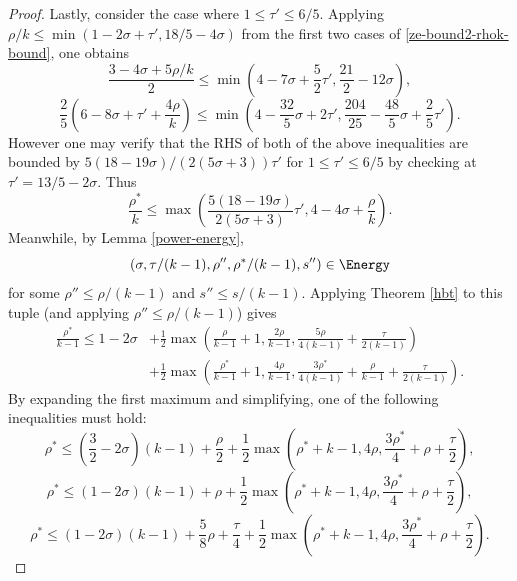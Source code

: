 \begin{proof}
Lastly, consider the case where $1 \le \tau' \le 6/5$. Applying $\rho/k \le \min(1 - 2\sigma + \tau', 18/5 - 4\sigma)$ from the first two cases of \eqref{ze-bound2-rhok-bound}, one obtains
\[
    \frac{3 - 4\sigma + 5\rho/k}{2} \le \min\left(4 - 7\sigma + \frac{5}{2}\tau', \frac{21}{2} - 12\sigma\right),
\]
\[
    \frac{2}{5}(6 - 8\sigma + \tau' + \frac{4\rho}{k}) \le \min\left(4 - \frac{32}{5}\sigma + 2\tau', \frac{204}{25} - \frac{48}{5}\sigma + \frac{2}{5}\tau'\right).
\]
However one may verify that the RHS of both of the above inequalities are bounded by $5(18 - 19\sigma)/(2(5\sigma + 3))\tau'$ for $1 \le \tau' \le 6/5$ by checking at $\tau' = 13/5 - 2\sigma$. Thus
\begin{equation}
    \label{ze-bound2-rhok-temp1}
    \frac{\rho^*}{k} \le \max\left(\frac{5(18 - 19\sigma)}{2(5\sigma + 3)}\tau', 4 - 4\sigma + \frac{\rho}{k}\right).
\end{equation}
Meanwhile, by Lemma \ref{power-energy},
\[
(\sigma, \tau/(k-1), \rho'', \rho^*/(k-1), s'')\in\Energy
\]
for some $\rho''\le\rho/(k-1)$ and $s''\le s/(k-1)$. Applying Theorem \ref{hbt} to this tuple (and applying $\rho''\le \rho/(k-1)$) gives
\begin{equation}\label{ze-bound2-rhostar-k1}
\begin{split}
\frac{\rho^*}{k - 1} \le 1-2\sigma &+ \frac{1}{2}\max(\frac{\rho}{k - 1}+1, \frac{2\rho}{k -1 }, \frac{5\rho}{4(k - 1)} + \frac{\tau}{2(k - 1)}) \\
&+ \frac{1}{2}\max(\frac{\rho^*}{k - 1}+1, \frac{4\rho}{k - 1}, \frac{3\rho^*}{4(k - 1)} +\frac{\rho}{k - 1}+\frac{\tau}{2(k-1)}).
\end{split}
\end{equation}
By expanding the first maximum and simplifying, one of the following inequalities must hold:
\begin{equation}\label{ze-bound2-rhostar-k1-case1}
    \rho^* \le (\frac{3}{2} - 2\sigma)(k - 1) + \frac{\rho}{2} + \frac{1}{2}\max(\rho^* + k - 1, 4\rho, \frac{3\rho^*}{4} + \rho + \frac{\tau}{2}),
\end{equation}
\begin{equation}\label{ze-bound2-rhostar-k1-case2}
\rho^* \le (1 - 2\sigma)(k - 1) + \rho + \frac{1}{2}\max(\rho^* + k - 1, 4\rho, \frac{3\rho^*}{4} + \rho + \frac{\tau}{2}),
\end{equation}
\begin{equation}\label{ze-bound2-rhostar-k1-case3}
\rho^* \le (1 - 2\sigma)(k - 1) + \frac{5}{8}\rho + \frac{\tau}{4} + \frac{1}{2}\max(\rho^* + k - 1, 4\rho, \frac{3\rho^*}{4} + \rho + \frac{\tau}{2}).

\end{equation}
\end{proof}
